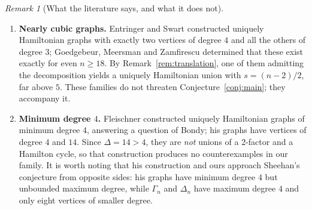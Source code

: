 \documentclass[11pt,a4paper]{article}
\theoremstyle{definition}
\theoremstyle{remark}
\newtheorem{remark}[theorem]{Remark}
\begin{document}
\begin{remark}[What the literature says, and what it does not]\label{rem:literature}
\begin{enumerate}[label=(\arabic*)]
\item \textbf{Nearly cubic graphs.} Entringer and Swart \cite{es80} constructed uniquely Hamiltonian graphs with exactly two vertices of degree $4$ and all the others of degree $3$; Goedgebeur, Meersman and Zamfirescu \cite{gmz20} determined that these exist exactly for even $n\ge18$. By Remark~\ref{rem:translation}, one of them admitting the decomposition yields a uniquely Hamiltonian union with $s=(n-2)/2$, far above $5$. These families do not threaten Conjecture~\ref{conj:main}; they accompany it.

\item \textbf{Minimum degree $4$.} Fleischner \cite{fleischner14} constructed uniquely Hamiltonian graphs of minimum degree $4$, answering a question of Bondy; his graphs have vertices of degree $4$ and $14$. Since $\Delta=14>4$, they are \emph{not} unions of a 2-factor and a Hamilton cycle, so that construction produces no counterexamples in our family. It is worth noting that his construction and ours approach Sheehan's conjecture from opposite sides: his graphs have minimum degree $4$ but unbounded maximum degree, while $\Gamma_n$ and $\Delta_n$ have maximum degree $4$ and only eight vertices of smaller degree.


\end{enumerate}
\end{remark}
\end{document}
